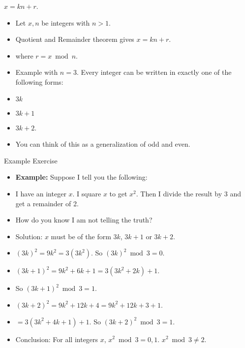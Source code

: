 \documentclass[handout]{beamer}
\begin{document}
\begin{frame}{$x=kn + r$.}

\begin{itemize}
 \item Let $x,n$ be integers with $n>1$.
 \item Quotient and Remainder theorem gives $x=kn+r$.
 \item where $r=x\bmod n$.
 \item Example with $n=3$. Every integer can be written in exactly one of the following forms:
 \item $3k$
 \item $3k+1$
 \item $3k+2$.
 \item You can think of this as a generalization of odd and even.
\end{itemize}

\end{frame}

\begin{frame}{Example Exercise}

\begin{itemize}
  \item \textbf{Example:} Suppose I tell you the following:
  \item I have an integer $x$. I square $x$ to get $x^2$. Then
  I divide the result by 3 and get a remainder of 2.
  \item How do you know I am not telling the truth?
  \item Solution: $x$ must be of the form $3k$, $3k+1$ or $3k+2$.
  \item $(3k)^2=9k^2= 3(3k^2)$. So $(3k)^2 \bmod 3 = 0$.
  \item $(3k+1)^2 = 9k^2 + 6k + 1 = 3(3k^2 + 2k) + 1$.
  \item So $(3k+1)^2 \bmod 3 = 1$.
  \item $(3k+2)^2 = 9k^2 + 12k + 4 = 9k^2 + 12k + 3 + 1$.
  \item $=3(3k^2 + 4k + 1) + 1$. So $(3k+2)^2 \bmod 3 = 1$.
  \item Conclusion: For all integers $x$, $x^2\bmod 3 = 0,1$. $x^2\bmod 3 \neq 2$.
\end{itemize}

\end{frame}
\end{document}
